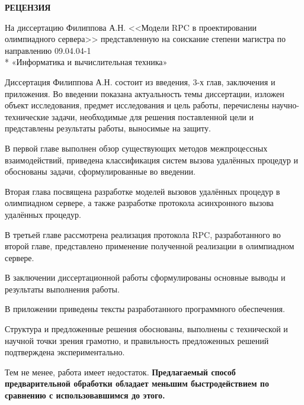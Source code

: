 
\renewcommand{\baselinestretch}{1.3} \setlength{\lineskiplimit}{-10cm}



\begin{titlepage}

\thispagestyle{empty}

\begin{center}
    \large \textbf{\uppercase{Рецензия}}

    \vspace{1em}

    На диссертацию Филиппова А.Н. <<Модели RPC в проектировании олимпиадного
    сервера>> представленную на соискание степени магистра по направлению
    09.04.04-1 \\*
    «Информатика и вычислительная техника»
\end{center}

\vspace{2em}

Диссертация Филиппова А.Н. состоит из введения, 3-х глав, заключения
и приложения. Во введении показана актуальность темы диссертации, изложен объект
исследования, предмет исследования и цель работы, перечислены научно-технические
задачи, необходимые для решения поставленной цели и представлены результаты
работы, выносимые на защиту.

В первой главе выполнен обзор существующих методов межпроцессных взаимодействий,
приведена классификация систем вызова удалённых процедур и обоснованы задачи,
сформулированные во введении.

Вторая глава посвящена разработке моделей вызовов удалённых процедур
в олимпиадном сервере, а также разработке протокола асинхронного вызова
удалённых процедур.

В третьей главе рассмотрена реализация протокола RPC, разработанного во второй
главе, представлено применение полученной реализации в олимпиадном сервере.

В заключении диссертационной работы сформулированы основные выводы и результаты
выполнения работы.

В приложении приведены тексты разработанного программного обеспечения.

Структура и предложенные решения обоснованы, выполнены с технической
и научной точки зрения грамотно, и правильность предложенных решений
подтверждена экспериментально.

%
Тем не менее, работа имеет недостаток. \textbf{Предлагаемый способ предварительной обработки обладает меньшим быстродействием по сравнению с использовавшимся до этого.}
%


\end{titlepage}
